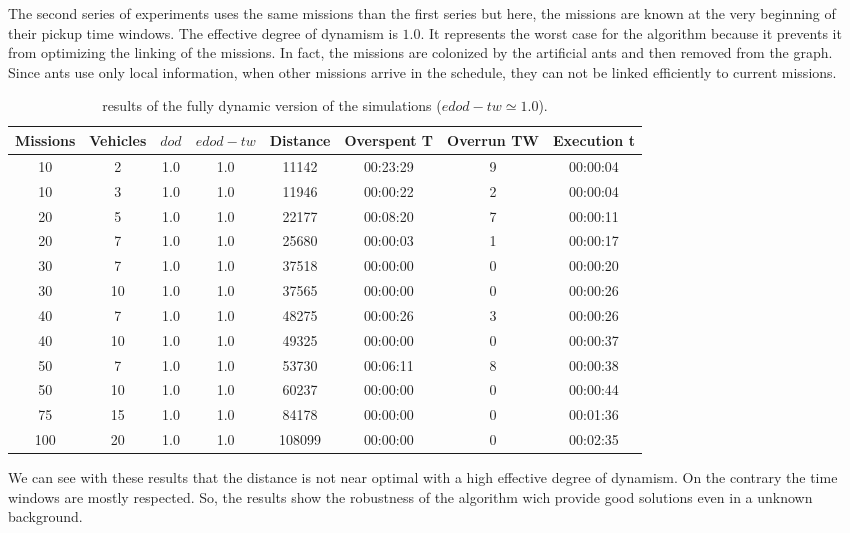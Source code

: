 \documentclass[review]{elsarticle}
\begin{document}
  \normalsize

  The second series of experiments uses the same missions than the first series but here, the missions are known at the very beginning of their pickup time windows. The effective degree of dynamism is $1.0$. It represents the worst case for the algorithm because it prevents it from optimizing the linking of the missions. In fact, the missions are colonized by the artificial ants and then removed from the graph. Since ants use only local information, when other missions arrive in the schedule, they can not be linked efficiently to current missions.

  \small
\begin{table}[h]
  \begin{center}
    \begin{tabular}{|c|c|c|c|c|c|c|c|} 
    \hline
    \bf{Missions} & \bf{Vehicles} & \bf{$dod$} & \bf{$edod-tw$} & \bf{Distance} & \bf{Overspent T} & \bf{Overrun TW} &  \bf{Execution t} \\ \hline
    10	 & 2 	& 1.0	& 1.0	& 11142	& 00:23:29	& 9	& 00:00:04\\
    10	 & 3 	& 1.0	& 1.0	& 11946	& 00:00:22	& 2	& 00:00:04\\
    20	 & 5 	& 1.0	& 1.0	& 22177	& 00:08:20	& 7	& 00:00:11\\
    20	 & 7 	& 1.0	& 1.0	& 25680	& 00:00:03	& 1	& 00:00:17\\
    30	 & 7 	& 1.0	& 1.0	& 37518	& 00:00:00	& 0	& 00:00:20\\
    30	 & 10 	& 1.0	& 1.0	& 37565	& 00:00:00	& 0	& 00:00:26\\
    40	 & 7 	& 1.0	& 1.0	& 48275	& 00:00:26	& 3	& 00:00:26\\
    40	 & 10 	& 1.0	& 1.0	& 49325	& 00:00:00	& 0	& 00:00:37\\
    50	 & 7 	& 1.0	& 1.0	& 53730	& 00:06:11	& 8	& 00:00:38\\
    50	 & 10 	& 1.0	& 1.0	& 60237	& 00:00:00	& 0	& 00:00:44\\
    75	 & 15 	& 1.0	& 1.0	& 84178	& 00:00:00	& 0	& 00:01:36\\
    100	 & 20 	& 1.0	& 1.0	& 108099& 00:00:00	& 0	& 00:02:35\\
    \hline
    \end{tabular}
  \caption{results of the fully dynamic version of the simulations ($edod-tw \simeq 1.0$).}
  \end{center}
\end{table}
  \normalsize

We can see with these results that the distance is not near optimal with a high effective degree of dynamism. On the contrary the time windows are mostly respected. So, the results show the robustness of the algorithm wich provide good solutions even in a unknown background.
\end{document}
